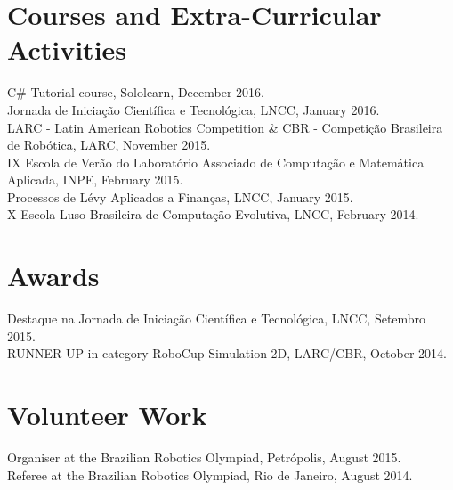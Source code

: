 \documentclass[margin, 10pt]{res} %
\begin{document}
\begin{resume}
\section{Courses and Extra-Curricular Activities} 
C\# Tutorial course, Sololearn, December 2016.\\
Jornada de Iniciação Científica e Tecnológica, LNCC, January 2016.\\
LARC - Latin American Robotics Competition \& CBR - Competição Brasileira de Robótica, LARC, November 2015.\\
IX Escola de Verão do Laboratório Associado de Computação e Matemática Aplicada, INPE, February 2015.\\
Processos de Lévy Aplicados a Finanças, LNCC, January 2015.\\
X Escola Luso-Brasileira de Computação Evolutiva, LNCC, February 2014.


\section{Awards} 
Destaque na Jornada de Iniciação Científica e Tecnológica, LNCC, Setembro 2015.\\
RUNNER-UP in category RoboCup Simulation 2D, LARC/CBR, October 2014.


\section{Volunteer Work}
Organiser at the Brazilian Robotics Olympiad, Petrópolis, August 2015.\\
Referee at the Brazilian Robotics Olympiad, Rio de Janeiro, August 2014.


\end{resume}
\end{document}
